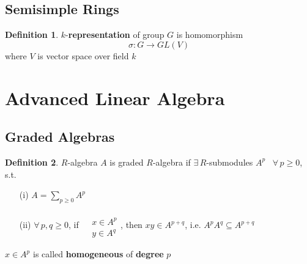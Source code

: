 \documentclass[twoside,landscape]{amsart}
\theoremstyle{plain}
\theoremstyle{definition}
\newtheorem{definition}{Definition}
\theoremstyle{remark}
\begin{document}
\begin{multicols*}{2}
\subsection{Semisimple Rings}

\begin{definition}
  $k$-\textbf{representation} of group $G$ is homomorphism
\[
\sigma : G \to GL(V) 
\]
where $V$ is vector space over field $k$
\end{definition}



\section{ Advanced Linear Algebra }

\subsection{}
\subsection{}
\subsection{}
\subsection{}
\subsection{}
\subsection{Graded Algebras}

\begin{definition}
  $R$-algebra $A$ is graded $R$-algebra if $\exists \, R$-submodules $A^p$ \, $\forall \, p \geq 0$, s.t. 
\begin{enumerate}
  \item[(i)] $A = \sum_{p\geq 0 } A^p$
\item[(ii)] $\forall \, p ,q \geq 0$, if $\begin{aligned} & \quad \\
  & x \in A^p \\
  & y \in A^q \end{aligned}$, then $xy \in A^{p+q}$, i.e. $A^p A^q \subseteq A^{p+q}$ \\
\end{enumerate}
\end{definition}
$x\in A^p$ is called \textbf{homogeneous} of \textbf{degree} $p$


\end{multicols*}
\end{document}
